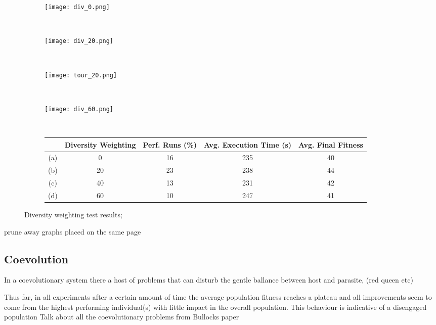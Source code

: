 \begin{figure}
	\centering
	\begin{subfigure}[ht]{0.49\textwidth}
		\texttt{[image: div\_0.png]}
		\caption{}
		\vspace{1em}
	\end{subfigure}
	~
	\begin{subfigure}[ht]{0.49\textwidth}
		\texttt{[image: div\_20.png]}
		\caption{}
		\vspace{1em}
	\end{subfigure}
	~
	\begin{subfigure}[ht]{0.49\textwidth}
		\texttt{[image: tour\_20.png]}
		\caption{}
		\vspace{1em}
	\end{subfigure}
	~
	\begin{subfigure}[ht]{0.49\textwidth}
		\texttt{[image: div\_60.png]}
		\caption{}
		\vspace{1em}
	\end{subfigure}
	~
	\begin{subfigure}[ht]{\textwidth}
		\centering
		\begin{tabular}{ccccc}
			\toprule
			& \bfseries{Diversity Weighting} &
			\bfseries{Perf. Runs (\%)} &
			\bfseries{Avg. Execution Time (s)} & \bfseries{Avg. Final Fitness}\\
			\midrule
			(a) & 0 & 16 & 235 & 40\\
			(b) & 20 & 23 & 238 & 44\\
			(c) & 40 & 13 & 231 & 42\\
			(d) & 60 & 10 & 247 & 41\\
			\bottomrule
		\end{tabular}
	\end{subfigure}

	\caption[Diversity weighting test results]{Diversity weighting test results;}
\end{figure}

\todo prune away graphs placed on the same page

\subsection{Coevolution}

In a coevolutionary system there a host of problems that can disturb the gentle
ballance between host and parasite, (red queen etc)

Thus far, in all experiments after a certain amount of time the average population
fitness reaches a plateau and all improvements seem to come from the highest performing
individual(s) with little impact in the overall population. This behaviour is indicative
of a disengaged population
\todo Talk about all the coevolutionary problems from Bullocks paper

